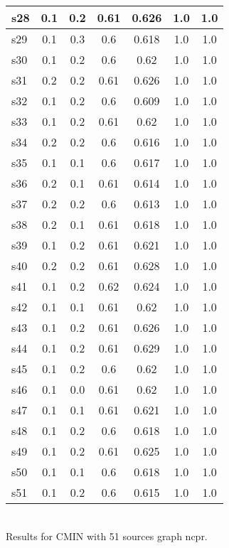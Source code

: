 \documentclass{article}
\begin{document}
\begin{tabular}{|l|c|c|c|c|c|c|}
\hline
s28 &0.1 & 0.2 & 0.61 & 0.626 & 1.0 & 1.0\\
\hline
s29 &0.1 & 0.3 & 0.6 & 0.618 & 1.0 & 1.0\\
\hline
s30 &0.1 & 0.2 & 0.6 & 0.62 & 1.0 & 1.0\\
\hline
s31 &0.2 & 0.2 & 0.61 & 0.626 & 1.0 & 1.0\\
\hline
s32 &0.1 & 0.2 & 0.6 & 0.609 & 1.0 & 1.0\\
\hline
s33 &0.1 & 0.2 & 0.61 & 0.62 & 1.0 & 1.0\\
\hline
s34 &0.2 & 0.2 & 0.6 & 0.616 & 1.0 & 1.0\\
\hline
s35 &0.1 & 0.1 & 0.6 & 0.617 & 1.0 & 1.0\\
\hline
s36 &0.2 & 0.1 & 0.61 & 0.614 & 1.0 & 1.0\\
\hline
s37 &0.2 & 0.2 & 0.6 & 0.613 & 1.0 & 1.0\\
\hline
s38 &0.2 & 0.1 & 0.61 & 0.618 & 1.0 & 1.0\\
\hline
s39 &0.1 & 0.2 & 0.61 & 0.621 & 1.0 & 1.0\\
\hline
s40 &0.2 & 0.2 & 0.61 & 0.628 & 1.0 & 1.0\\
\hline
s41 &0.1 & 0.2 & 0.62 & 0.624 & 1.0 & 1.0\\
\hline
s42 &0.1 & 0.1 & 0.61 & 0.62 & 1.0 & 1.0\\
\hline
s43 &0.1 & 0.2 & 0.61 & 0.626 & 1.0 & 1.0\\
\hline
s44 &0.1 & 0.2 & 0.61 & 0.629 & 1.0 & 1.0\\
\hline
s45 &0.1 & 0.2 & 0.6 & 0.62 & 1.0 & 1.0\\
\hline
s46 &0.1 & 0.0 & 0.61 & 0.62 & 1.0 & 1.0\\
\hline
s47 &0.1 & 0.1 & 0.61 & 0.621 & 1.0 & 1.0\\
\hline
s48 &0.1 & 0.2 & 0.6 & 0.618 & 1.0 & 1.0\\
\hline
s49 &0.1 & 0.2 & 0.61 & 0.625 & 1.0 & 1.0\\
\hline
s50 &0.1 & 0.1 & 0.6 & 0.618 & 1.0 & 1.0\\
\hline
s51 &0.1 & 0.2 & 0.6 & 0.615 & 1.0 & 1.0\\
\hline
\end{tabular}\\

\noindent Results for CMIN with 51 sources graph ncpr.
\end{document}
